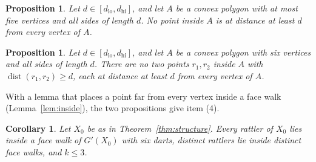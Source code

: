 \documentclass[12pt]{amsart}
\newtheorem{proposition}[theorem]{Proposition}
\newtheorem{corollary}[theorem]{Corollary}
\theoremstyle{definition}
\theoremstyle{plain}
\theoremstyle{definition}
\newcommand{\dist}{\operatorname{dist}}
\newcommand{\dlo}{d_{\mathrm{lo}}}
\newcommand{\dhi}{d_{\mathrm{hi}}}
\newcommand{\leanmap}[1]{\ignorespaces}
\newcommand{\codemap}[1]{\ignorespaces}
\newcommand{\mapnote}[1]{\ignorespaces}
\begin{document}
\begin{proposition}\label{prop:nor}\leanmap{Tammes15.Geom.nor, Tammes15.Geom.no_small_face, Tammes15.Geom.wheel_sum, Tammes15.Geom.subtend_le_alpha, Tammes15.Geom.subtend_alg, Tammes15.Geom.disc_side, Tammes15.alpha_dhi_lt}
Let $d\in[\dlo,\dhi]$, and let $A$ be a convex polygon with at most five vertices and all sides of length $d$. No point inside $A$ is at distance at least $d$ from every vertex of $A$.
\end{proposition}

\begin{proposition}\label{prop:onehex}\leanmap{Tammes15.Geom.onehex, Tammes15.Geom.disc_side, Tammes15.Geom.disc_slerp, Tammes15.Geom.inClosed_of_disc, Tammes15.Geom.qpoly_isCPoly, Tammes15.Geom.qpoly_perim, Tammes15.Geom.perim_mono, Tammes15.margin_onehex_poly, Tammes15.onehex_chord_margin}\codemap{code/lean/numerics/onehex_poly.gp > code/lean/numerics/onehex_poly.out}
Let $d\in[\dlo,\dhi]$, and let $A$ be a convex polygon with six vertices and all sides of length $d$. There are no two points $r_1,r_2$ inside $A$ with $\dist(r_1,r_2)\ge d$, each at distance at least $d$ from every vertex of $A$.
\end{proposition}

With a lemma that places a point far from every vertex inside a face walk (Lemma~\ref{lem:inside}), the two propositions give item (4).

\begin{corollary}\label{cor:k3}\leanmap{Tammes15.Geom.rattlers_in_hexagons_proof, Tammes15.Geom.rattlers_core, Tammes15.Geom.exists_face_inside, Tammes15.k_le_three_of_hex}\mapnote{the hexagon of a rattler is found as the face of an edge nearest to it, and then counted as in the proof}
Let $X_0$ be as in Theorem~\ref{thm:structure}. Every rattler of $X_0$ lies inside a face walk of $G'(X_0)$ with six darts, distinct rattlers lie inside distinct face walks, and $k\le3$.
\end{corollary}
\end{document}
